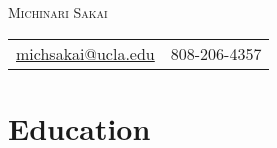 \documentclass[10pt]{article} %
\begin{document}
\setlength{\parskip}{\baselineskip}%
\pagestyle{empty} %



\begin{center}
	{\huge{\textsc{Michinari Sakai}}}\\%
	\noindent\begin{tabular}{r @{$\quad\bullet\quad$} l}
		\href{mailto:michsakai@ucla.edu}{michsakai@ucla.edu} & 808-206-4357
	\end{tabular}
\end{center}

%


\section{Education}
\end{document}
